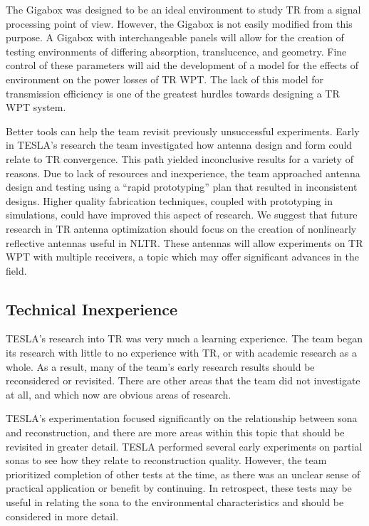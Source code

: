 The Gigabox was designed to be an ideal environment to study TR from a signal processing point of view. However, the Gigabox is not easily modified from this purpose. A Gigabox with interchangeable panels will allow for the creation of testing environments of differing absorption, translucence, and geometry. Fine control of these parameters will aid the development of a model for the effects of environment on the power losses of TR WPT. The lack of this model for transmission efficiency is one of the greatest hurdles towards designing a TR WPT system.

Better tools can help the team revisit previously unsuccessful experiments. Early in TESLA's research the team investigated how antenna design and form could relate to TR convergence.  This path yielded inconclusive results for a variety of reasons. Due to lack of resources and inexperience, the team approached antenna design and testing using a ``rapid prototyping'' plan that resulted in inconsistent designs. Higher quality fabrication techniques, coupled with prototyping in simulations, could have improved this aspect of research.  We suggest that future research in TR antenna optimization should focus on the creation of nonlinearly reflective antennas useful in NLTR.  These antennas will allow experiments on TR WPT with multiple receivers, a topic which may offer significant advances in the field.

\subsection{Technical Inexperience}

TESLA's research into TR was very much a learning experience.  The team began its research with little to no experience with TR, or with academic research as a whole.  As a result, many of the team's early research results should be reconsidered or revisited. There are other areas that the team did not investigate at all, and which now are obvious areas of research.

TESLA's experimentation focused significantly on the relationship between sona and reconstruction, and there are more areas within this topic that should be revisited in greater detail.  TESLA performed several early experiments on partial sonas to see how they relate to reconstruction quality.  However, the team prioritized completion of other tests at the time, as there was an unclear sense of practical application or benefit by continuing.  In retrospect, these tests may be useful in relating the sona to the environmental characteristics and should be considered in more detail.

